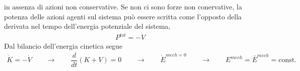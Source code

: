 \documentclass[letterpaper,10pt,english]{jupyterBook}
\begin{document}
\sphinxAtStartPar
in assenza di azioni non conservative. Se non ci sono forze non conervative, la potenza delle azioni agenti sul sistema può essere scritta come l’opposto della derivata nel tempo dell’energia potenziale del sistema,
\begin{equation*}
\begin{split}P^{tot} = -\dot{V}\end{split}
\end{equation*}
\sphinxAtStartPar
Dal bilancio dell’energia cinetica segue
\begin{equation*}
\begin{split}\dot{K} = - \dot{V} \qquad \rightarrow \qquad \dfrac{d}{dt}(K+V) = 0 \qquad \rightarrow \qquad \dot{E}^{mech = 0} \qquad \rightarrow \qquad E^{mech} = \bar{E}^{mech} = \text{const.}\end{split}
\end{equation*}
\sphinxstepscope
\end{document}
